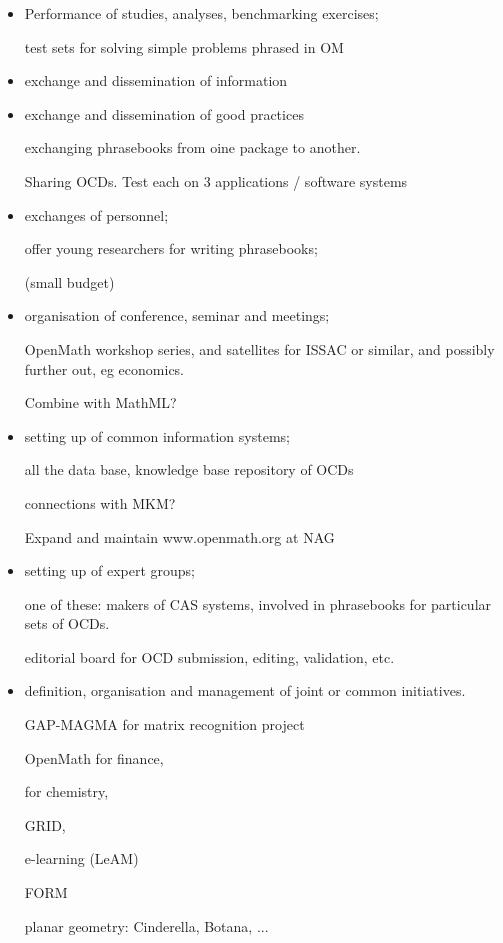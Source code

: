 \documentclass[draft]{artikel3}
\begin{document}
\begin{itemize}
\item
Performance of studies, analyses, benchmarking exercises;

test sets for  solving simple problems phrased in OM


\item
exchange and dissemination of information

\item exchange and dissemination of good practices

exchanging phrasebooks from oine package to another.

Sharing OCDs.
Test each on 3 applications / software systems

\item exchanges of personnel;

offer young researchers for writing phrasebooks;

(small  budget)


\item 
organisation of conference, seminar and meetings;

OpenMath workshop series, and satellites for ISSAC or similar, and possibly
further out, eg economics.

Combine with MathML?

\item 
setting up of common information systems;

all the data base, knowledge base repository of OCDs

connections with MKM?

Expand and maintain www.openmath.org at NAG


\item 
setting up of expert groups;

one of these: makers of CAS systems, involved in phrasebooks for
particular sets of OCDs.

editorial board for OCD submission, editing, validation, etc.

\item 
definition, organisation and management of joint or common initiatives.

GAP-MAGMA for matrix recognition project

OpenMath for finance,

for chemistry,

GRID,

e-learning (LeAM)

FORM

planar geometry: Cinderella, Botana, ...



\end{itemize}
\end{document}
